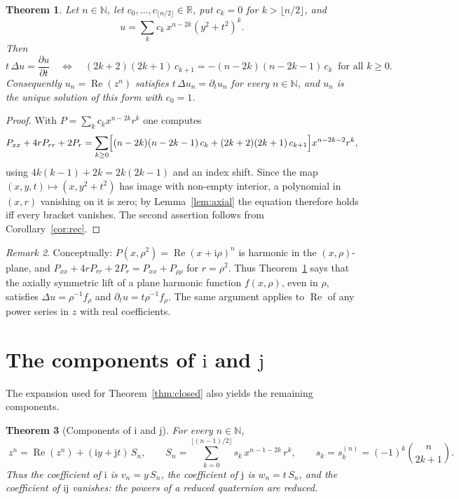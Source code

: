 \documentclass[11pt,a4paper]{article}
\newcommand{\ii}{\mathrm{i}}
\newcommand{\jj}{\mathrm{j}}
\DeclareMathOperator{\Real}{Re}
\newcommand{\R}{\mathbb{R}}
\newcommand{\N}{\mathbb{N}}
\newtheorem{theorem}{Theorem}
\theoremstyle{remark}
\newtheorem{remark}[theorem]{Remark}
\begin{document}
\begin{theorem}\label{thm:lb}
Let $n\in\N$, let $c_0,\dots,c_{\lfloor n/2\rfloor}\in\R$, put $c_k=0$ for
$k>\lfloor n/2\rfloor$, and
\[
  u=\sum_{k}c_k\,x^{n-2k}(y^2+t^2)^k .
\]
Then
\[
  t\,\Delta u=\frac{\partial u}{\partial t}
  \quad\Longleftrightarrow\quad
  (2k+2)(2k+1)\,c_{k+1}=-(n-2k)(n-2k-1)\,c_k\ \text{ for all } k\ge 0 .
\]
Consequently $u_n=\Real(z^n)$ satisfies $t\,\Delta u_n=\partial_t u_n$ for every
$n\in\N$, and $u_n$ is the unique solution of this form with $c_0=1$.
\end{theorem}

\begin{proof}
With $P=\sum_k c_kx^{n-2k}r^k$ one computes
\[
  P_{xx}+4rP_{rr}+2P_r
  =\sum_{k\ge 0}\Bigl[(n-2k)(n-2k-1)\,c_k+(2k+2)(2k+1)\,c_{k+1}\Bigr]x^{n-2k-2}r^k,
\]
using $4k(k-1)+2k=2k(2k-1)$ and an index shift. Since the map
$(x,y,t)\mapsto(x,y^2+t^2)$ has image with non-empty interior, a polynomial in
$(x,r)$ vanishing on it is zero; by Lemma~\ref{lem:axial} the equation therefore
holds iff every bracket vanishes. The second assertion follows from
Corollary~\ref{cor:rec}.
\end{proof}

\begin{remark}
Conceptually: $P(x,\rho^2)=\Real(x+\ii\rho)^n$ is harmonic in the $(x,\rho)$-plane,
and $P_{xx}+4rP_{rr}+2P_r=P_{xx}+P_{\rho\rho}$ for $r=\rho^2$. Thus
Theorem~\ref{thm:lb} says that the axially symmetric lift of a plane harmonic
function $f(x,\rho)$, even in $\rho$, satisfies $\Delta u=\rho^{-1}f_\rho$ and
$\partial_tu=t\rho^{-1}f_\rho$. The same argument applies to $\Real$ of any power
series in $z$ with real coefficients.
\end{remark}

\section{The components of $\ii$ and $\jj$}

The expansion used for Theorem~\ref{thm:closed} also yields the remaining components.

\begin{theorem}[Components of $\ii$ and $\jj$]\label{thm:imag}
For every $n\in\N$,
\[
  \boxed{\;z^n=\Real(z^n)+(\ii y+\jj t)\,S_n,\qquad
  S_n=\sum_{k=0}^{\lfloor (n-1)/2\rfloor}s_k\,x^{n-1-2k}\,r^k,\qquad
  s_k=s_k^{(n)}=(-1)^k\binom{n}{2k+1}.\;}
\]
Thus the coefficient of $\ii$ is $v_n=y\,S_n$, the coefficient of $\jj$ is $w_n=t\,S_n$, and
the coefficient of $\ii\jj$ vanishes: the powers of a reduced quaternion are reduced.
\end{theorem}
\end{document}
